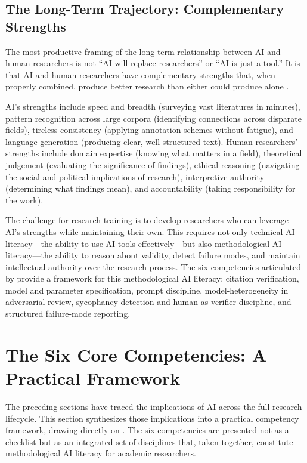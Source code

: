 \documentclass[12pt, a4paper]{article}
\begin{document}
\subsection{The Long-Term Trajectory: Complementary Strengths}

The most productive framing of the long-term relationship between AI and human researchers is not ``AI will replace researchers'' or ``AI is just a tool.'' It is that AI and human researchers have complementary strengths that, when properly combined, produce better research than either could produce alone \citep{shi2026survey, roles2025ai}.

AI's strengths include speed and breadth (surveying vast literatures in minutes), pattern recognition across large corpora (identifying connections across disparate fields), tireless consistency (applying annotation schemes without fatigue), and language generation (producing clear, well-structured text). Human researchers' strengths include domain expertise (knowing what matters in a field), theoretical judgement (evaluating the significance of findings), ethical reasoning (navigating the social and political implications of research), interpretive authority (determining what findings mean), and accountability (taking responsibility for the work).

The challenge for research training is to develop researchers who can leverage AI's strengths while maintaining their own. This requires not only technical AI literacy---the ability to use AI tools effectively---but also methodological AI literacy---the ability to reason about validity, detect failure modes, and maintain intellectual authority over the research process. The six competencies articulated by \citet{zyphur2026responsible} provide a framework for this methodological AI literacy: citation verification, model and parameter specification, prompt discipline, model-heterogeneity in adversarial review, sycophancy detection and human-as-verifier discipline, and structured failure-mode reporting.

\section{The Six Core Competencies: A Practical Framework}

The preceding sections have traced the implications of AI across the full research lifecycle. This section synthesizes those implications into a practical competency framework, drawing directly on \citet{zyphur2026responsible}. The six competencies are presented not as a checklist but as an integrated set of disciplines that, taken together, constitute methodological AI literacy for academic researchers.
\end{document}
